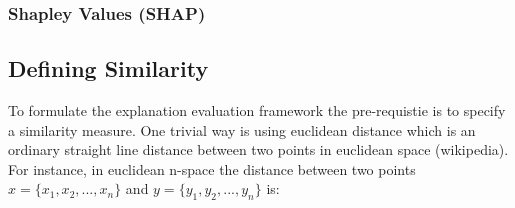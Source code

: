\documentclass[english]{tktltiki2}
\theoremstyle{definition}
\theoremstyle{remark}
\begin{document}
%
%
%

\subsubsection{Shapley Values (SHAP)} %

\subsection{Defining Similarity}\label{sec:defining_similarity} %
To formulate the explanation evaluation framework the pre-requistie is to specify a similarity measure. One trivial way is using euclidean distance which is an ordinary straight line distance between two points in euclidean space (wikipedia). For instance, in euclidean n-space the distance between two points $x = \{x_1, x_2, ..., x_n\}$ and $y = \{y_1, y_2, ..., y_n\}$ is:
\end{document}
